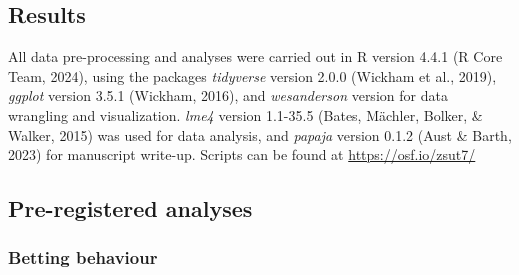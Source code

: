 \documentclass[
  man,floatsintext]{apa6}
\begin{document}
\hypertarget{results}{%
\subsection{Results}\label{results}}

All data pre-processing and analyses were carried out in R version 4.4.1 (R Core Team, 2024), using the packages \emph{tidyverse} version 2.0.0 (Wickham et al., 2019), \emph{ggplot} version 3.5.1 (Wickham, 2016), and \emph{wesanderson} version for data wrangling and visualization. \emph{lme4} version 1.1-35.5 (Bates, Mächler, Bolker, \& Walker, 2015) was used for data analysis, and \emph{papaja} version 0.1.2 (Aust \& Barth, 2023) for manuscript write-up. Scripts can be found at \url{https://osf.io/zsut7/}

\hypertarget{pre-registered-analyses}{%
\subsection{Pre-registered analyses}\label{pre-registered-analyses}}

\hypertarget{betting-behaviour}{%
\subsubsection{Betting behaviour}\label{betting-behaviour}}
\end{document}
